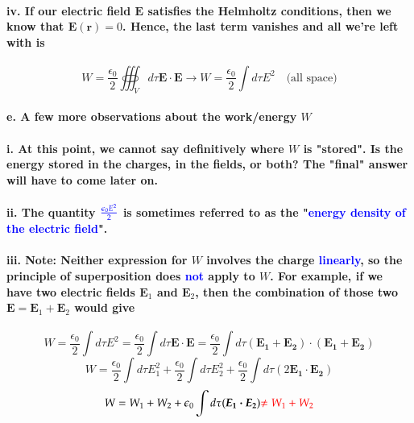 \documentclass{article}
\begin{document}
\paragraph{\indent iv. If our electric field $\boldsymbol{E}$ satisfies the Helmholtz conditions, then we know that $\boldsymbol{E}(\boldsymbol{r})=0$. Hence, the last term vanishes and all we're left with is}
\begin{equation*}
    W=\frac{\epsilon_0}{2}\oiiint_V d\tau \boldsymbol{E\cdot E} \longrightarrow W=\frac{\epsilon_0}{2}\int d\tau E^2 \quad \text{(all space)}
\end{equation*}
\paragraph{\indent e. A few more observations about the work/energy $W$}
\paragraph{\indent i. At this point, we cannot say definitively where $W$ is "stored". Is the energy stored in the charges, in the fields, or both? The "final" answer will have to come later on.}
\paragraph{\indent ii. The quantity $\textcolor{blue}{\frac{\epsilon_0 E^2}{2}}$ is sometimes referred to as the "\textcolor{blue}{energy density of the electric field}".}
\paragraph{\indent iii. Note: Neither expression for $W$ involves the charge \textcolor{blue}{linearly}, so the principle of superposition does \textcolor{blue}{not} apply to $W$. For example, if we have two electric fields $\boldsymbol{E}_1$ and $\boldsymbol{E}_2$, then the combination of those two $\boldsymbol{E}=\boldsymbol{E}_1+\boldsymbol{E}_2$ would give}
\begin{equation*}
    W=\frac{\epsilon_0}{2}\int d\tau E^2=\frac{\epsilon_0}{2}\int d\tau \boldsymbol{E\cdot E}=\frac{\epsilon_0}{2}\int d\tau(\boldsymbol{E_1+E_2})\cdot(\boldsymbol{E_1+E_2})
\end{equation*}
\begin{equation*}
    W=\frac{\epsilon_0}{2}\int d\tau E_1^2+\frac{\epsilon_0}{2}\int d\tau E_2^2+\frac{\epsilon_0}{2}\int d\tau (2\boldsymbol{E_1\cdot E_2})
\end{equation*}
\begin{equation*}
    W=W_1+W_2+\epsilon_0 \int d\tau (\boldsymbol{E_1\cdot E_2})\textcolor{red}{\neq W_1+W_2}
\end{equation*}
\end{document}
